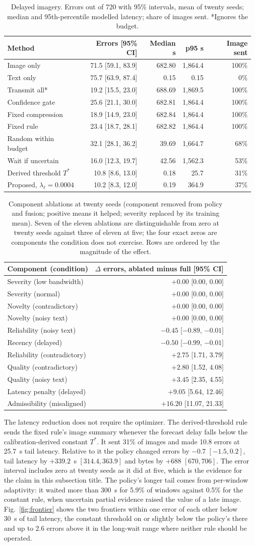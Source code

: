 \documentclass[conference,a4paper]{IEEEtran}
\makeatletter
\newif\ifsubmission
\newcommand{\masteronly}[1]{\ifsubmission\else#1\fi}
\newcommand{\tabledelay}{%
\begin{table}[t]
\caption{Delayed imagery. Errors out of 720 with 95\% intervals, mean of twenty seeds; median and 95th-percentile modelled latency; share of images sent. *Ignores the budget.}
\label{tab:delay}
\centering\scriptsize\setlength{\tabcolsep}{3pt}
\begin{tabular}{@{}lrrrr@{}}
\toprule
Method & Errors [95\% CI] & Median s & p95 s & Image sent \\
\midrule
Image only & 71.5 [59.1, 83.9] & 682.80 & 1,864.4 & 100\% \\
Text only & 75.7 [63.9, 87.4] & 0.15 & 0.15 & 0\% \\
Transmit all* & 19.2 [15.5, 23.0] & 688.69 & 1,869.5 & 100\% \\
Confidence gate & 25.6 [21.1, 30.0] & 682.81 & 1,864.4 & 100\% \\
Fixed compression & 18.9 [14.9, 23.0] & 682.84 & 1,864.4 & 100\% \\
Fixed rule & 23.4 [18.7, 28.1] & 682.82 & 1,864.4 & 100\% \\
Random within budget & 32.1 [28.1, 36.2] & 39.69 & 1,664.7 & 68\% \\
Wait if uncertain & 16.0 [12.3, 19.7] & 42.56 & 1,562.3 & 53\% \\
Derived threshold $T^\ast$ & 10.8 [8.6, 13.0] & 0.18 & 25.7 & 31\% \\
Proposed, $\lambda_\ell=0.0004$ & 10.2 [8.3, 12.0] & 0.19 & 364.9 & 37\% \\
\bottomrule
\end{tabular}
\end{table}
}
\makeatother
\begin{document}
\tabledelay

\masteronly{%
\begin{table}[!t]
\caption{Component ablations at twenty seeds (component removed from policy and fusion; positive means it helped; severity replaced by its training mean). Seven of the eleven ablations are distinguishable from zero at twenty seeds against three of eleven at five; the four exact zeros are components the condition does not exercise. Rows are ordered by the magnitude of the effect.}
\label{tab:ablation}
\centering\footnotesize
\begin{tabular}{@{}lr@{}}
\toprule
Component (condition) & $\Delta$ errors, ablated minus full [95\% CI] \\
\midrule
Severity (low bandwidth) & $+0.00$ [0.00, 0.00] \\
Severity (normal) & $+0.00$ [0.00, 0.00] \\
Novelty (contradictory) & $+0.00$ [0.00, 0.00] \\
Novelty (noisy text) & $+0.00$ [0.00, 0.00] \\
Reliability (noisy text) & $-0.45$ [$-0.89$, $-0.01$] \\
Recency (delayed) & $-0.50$ [$-0.99$, $-0.01$] \\
Reliability (contradictory) & $+2.75$ [1.71, 3.79] \\
Quality (contradictory) & $+2.80$ [1.52, 4.08] \\
Quality (noisy text) & $+3.45$ [2.35, 4.55] \\
Latency penalty (delayed) & $+9.05$ [5.64, 12.46] \\
Admissibility (misaligned) & $+16.20$ [11.07, 21.33] \\
\bottomrule
\end{tabular}
\end{table}}%

The latency reduction does not require the optimizer. The derived-threshold rule sends the fixed rule's image summary whenever the forecast delay falls below the calibration-derived constant $T^\ast$. It sent 31\% of images and made 10.8 errors at 25.7~s tail latency. Relative to it the policy changed errors by $-0.7$ $[-1.5, 0.2]$, tail latency by $+339.2$~s $[314.4, 363.9]$ and bytes by $+688$ $[670, 706]$. The error interval includes zero at twenty seeds as it did at five, which is the evidence for the claim in this subsection title. The policy's longer tail comes from per-window adaptivity: it waited more than 300~s for 5.9\% of windows against 0.5\% for the constant rule, when uncertain partial evidence raised the value of a late image. Fig.~\ref{fig:frontier} shows the two frontiers within one error of each other below 30~s of tail latency, the constant threshold on or slightly below the policy's there and up to 2.6 errors above it in the long-wait range where neither rule should be operated.
\end{document}
